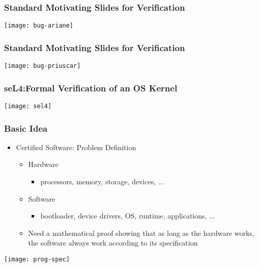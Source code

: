\begin{frame}[plain]	
	\frametitle{Standard Motivating Slides for Verification}

	\centering
	\texttt{[image: bug-ariane]}

	
\end{frame}

\begin{frame}[plain]	
	\frametitle{Standard Motivating Slides for Verification}
	
	\centering
	\texttt{[image: bug-priuscar]}
	
	
\end{frame}

\begin{frame}[plain]	
	\frametitle{seL4:Formal Verification of an OS Kernel}
	
	\centering
	\texttt{[image: sel4]}
	
	
\end{frame}
\begin{frame}[plain]	
	\frametitle{Basic Idea}
	
	\begin{itemize}\Large
		\item Certified Software: Problem Definition
		\begin{itemize}\large
			\item Hardware
			\begin{itemize}\large
				\item processors, memory, storage, devices, ...
	
			\end{itemize}
			\item Software
			\begin{itemize}\large
				\item bootloader, device drivers, OS, runtime, applications, ...
			
			\end{itemize}
			\item Need a mathematical proof showing that
			as long as the hardware works, the software
			always work according to its specification						
		\end{itemize}
	\end{itemize}
	
	\centering
\texttt{[image: prog-spec]}
	
\end{frame}

